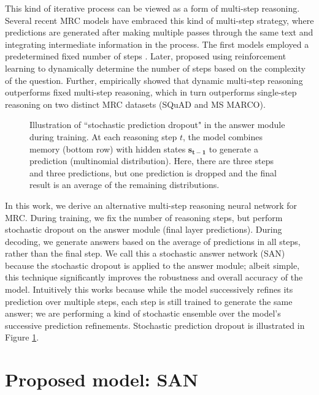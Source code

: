 \documentclass[11pt,a4paper]{article}
\begin{document}
This kind of iterative process can be viewed as a form of multi-step reasoning. 
Several recent MRC models have embraced this kind of multi-step strategy, where 
predictions are generated after making multiple passes through the same text and integrating intermediate information in the process.
The first models employed a predetermined fixed number of steps \cite{hill2015goldilocks,dhingra2016gated,sordoni2016iterative,kumar15askme}.
Later,  proposed using reinforcement learning to dynamically determine the number of steps based on the complexity of the question.
Further,  empirically showed that dynamic multi-step reasoning outperforms fixed multi-step reasoning, 
which in turn outperforms single-step reasoning on two distinct MRC datasets (SQuAD and MS MARCO). 

\begin{figure}[t]
    \centering
{}
\caption{\label{fig:answer-module} Illustration of ``stochastic prediction dropout" in the answer module during training. At each reasoning step $t$, the model combines memory (bottom row) with hidden states $\mathbf{s_{t-1}}$ to generate a prediction (multinomial distribution). Here, there are three steps and three predictions, but one prediction is dropped and the final result is an average of the remaining distributions.
} 
\end{figure}  
  



In this work, we derive an alternative multi-step reasoning neural network for MRC. 
During training, we fix the number of reasoning steps, but perform stochastic dropout on the answer module (final layer predictions).
During decoding, we generate answers based on the average of predictions in all steps, rather than the final step. 
We call this a stochastic answer network (SAN) because the stochastic dropout is applied to the answer module; 
albeit simple, this technique significantly improves the robustness and overall accuracy of the model. 
Intuitively this works because while the model successively refines its prediction over multiple steps, each step is still trained to generate the same answer;
we are performing a kind of stochastic ensemble over the model's successive prediction refinements. 
Stochastic prediction dropout is illustrated in Figure \ref{fig:answer-module}.


\section{Proposed model: SAN}
\label{sec:model}
\end{document}
